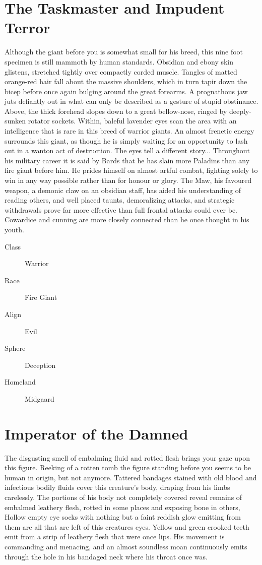 \begin{multicols}{2}
\section{The Taskmaster and Impudent Terror}
	Although the giant before you is somewhat small for his breed, this nine foot specimen is still mammoth by human standards. Obsidian and ebony skin glistens, stretched tightly over compactly corded muscle. Tangles of matted orange-red hair fall about the massive shoulders, which in turn tapir down the bicep before once again bulging around the great forearms. A prognathous jaw juts defiantly out in what can only be described as a gesture of stupid obstinance. Above, the thick forehead slopes down to a great bellow-nose, ringed by deeply-sunken rotator sockets. Within, baleful lavender eyes scan the area with an intelligence that is rare in this breed of warrior giants.  An almost frenetic energy surrounds this giant, as though he is simply waiting for an opportunity to lash out in a wanton act of destruction. The eyes tell a different story...
	Throughout his military career it is said by Bards that he has slain more Paladins than any fire giant before him. He prides himself on almost artful combat, fighting solely to win in any way possible rather than for honour or glory. The Maw, his favoured weapon, a demonic claw on an obsidian staff, has aided his understanding of reading others, and well placed taunts, demoralizing attacks, and strategic withdrawals prove far more effective than full frontal attacks could ever be. Cowardice and cunning are more closely connected than he once thought in his youth.
\begin{description}
  \item[Class] Warrior
  \item[Race] Fire Giant
  \item[Align] Evil
  \item[Sphere] Deception
  \item[Homeland] Midgaard
\end{description}

\section{Imperator of the Damned} 
The disgusting smell of embalming fluid and rotted flesh brings your gaze upon this figure. Reeking of a rotten tomb the figure standing before you seems to be human in origin, but not anymore. Tattered bandages stained with
old blood and infectious bodily fluids cover this creature's body, draping from his limbs carelessly. The portions of his body not completely covered reveal remains of embalmed leathery flesh, rotted in some places and exposing bone in others, Hollow empty eye socks with nothing but a faint reddish glow emitting from them are all that are left of this creatures eyes. Yellow and green crooked teeth emit from a strip of leathery flesh that were once lips. His movement is commanding and menacing, and an almost soundless moan continuously emits through the hole in his bandaged neck where his throat once was.



\end{multicols}

